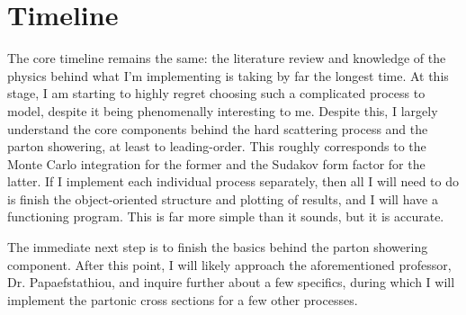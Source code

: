 \section{Timeline}\label{sec:Timeline}

The core timeline remains the same: the literature review and knowledge of the physics behind what I'm implementing is taking by far the longest time. At this stage, I am starting to highly regret choosing such a complicated process to model, despite it being phenomenally interesting to me. Despite this, I largely understand the core components behind the hard scattering process and the parton showering, at least to leading-order. This roughly corresponds to the Monte Carlo integration for the former and the Sudakov form factor for the latter. If I implement each individual process separately, then all I will need to do is finish the object-oriented structure and plotting of results, and I will have a functioning program. This is far more simple than it sounds, but it is accurate.

The immediate next step is to finish the basics behind the parton showering component. After this point, I will likely approach the aforementioned professor, Dr. Papaefstathiou, and inquire further about a few specifics, during which I will implement the partonic cross sections for a few other processes.


